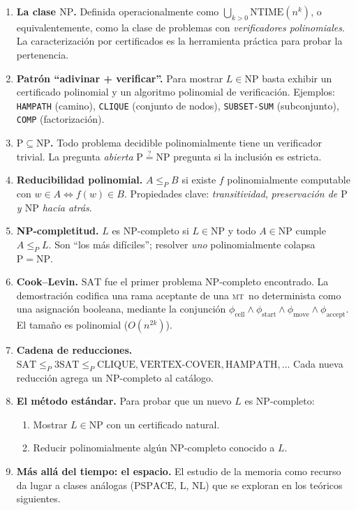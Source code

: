 \documentclass[11pt,a4paper]{article}
\theoremstyle{definicion}
\newcommand{\MT}{\textsc{mt}}
\newcommand{\redP}{\leq_{P}}
\newcommand{\NP}{\mathrm{NP}}
\newcommand{\Pclass}{\mathrm{P}}
\begin{document}
\begin{enumerate}
    \item \textbf{La clase $\NP$.} Definida operacionalmente como $\bigcup_{k>0} \mathrm{NTIME}(n^k)$, o equivalentemente, como la clase de problemas con \emph{verificadores polinomiales}. La caracterización por certificados es la herramienta práctica para probar la pertenencia.

    \item \textbf{Patrón ``adivinar + verificar''.} Para mostrar $L \in \NP$ basta exhibir un certificado polinomial y un algoritmo polinomial de verificación. Ejemplos: \texttt{HAMPATH} (camino), \texttt{CLIQUE} (conjunto de nodos), \texttt{SUBSET-SUM} (subconjunto), \texttt{COMP} (factorización).

    \item \textbf{$\Pclass \subseteq \NP$.} Todo problema decidible polinomialmente tiene un verificador trivial. La pregunta \emph{abierta} $\Pclass \overset{?}{=} \NP$ pregunta si la inclusión es estricta.

    \item \textbf{Reducibilidad polinomial.} $A \redP B$ si existe $f$ polinomialmente computable con $w \in A \iff f(w) \in B$. Propiedades clave: \emph{transitividad}, \emph{preservación de $\Pclass$ y $\NP$ hacia atrás}.

    \item \textbf{NP-completitud.} $L$ es NP-completo si $L \in \NP$ y todo $A \in \NP$ cumple $A \redP L$. Son ``los más difíciles''; resolver \emph{uno} polinomialmente colapsa $\Pclass = \NP$.

    \item \textbf{Cook--Levin.} $\mathrm{SAT}$ fue el primer problema NP-completo encontrado. La demostración codifica una rama aceptante de una \MT\ no determinista como una asignación booleana, mediante la conjunción $\phi_{\text{cell}} \land \phi_{\text{start}} \land \phi_{\text{move}} \land \phi_{\text{accept}}$. El tamaño es polinomial ($O(n^{2k})$).

    \item \textbf{Cadena de reducciones.} $\mathrm{SAT} \redP 3\mathrm{SAT} \redP \mathrm{CLIQUE}, \mathrm{VERTEX\text{-}COVER}, \mathrm{HAMPATH}, \dots$ Cada nueva reducción agrega un NP-completo al catálogo.

    \item \textbf{El método estándar.} Para probar que un nuevo $L$ es NP-completo:
    \begin{enumerate}
        \item Mostrar $L \in \NP$ con un certificado natural.
        \item Reducir polinomialmente algún NP-completo conocido a $L$.
    \end{enumerate}

    \item \textbf{Más allá del tiempo: el espacio.} El estudio de la memoria como recurso da lugar a clases análogas ($\mathrm{PSPACE}$, $\mathrm{L}$, $\mathrm{NL}$) que se exploran en los teóricos siguientes.
\end{enumerate}
\end{document}
